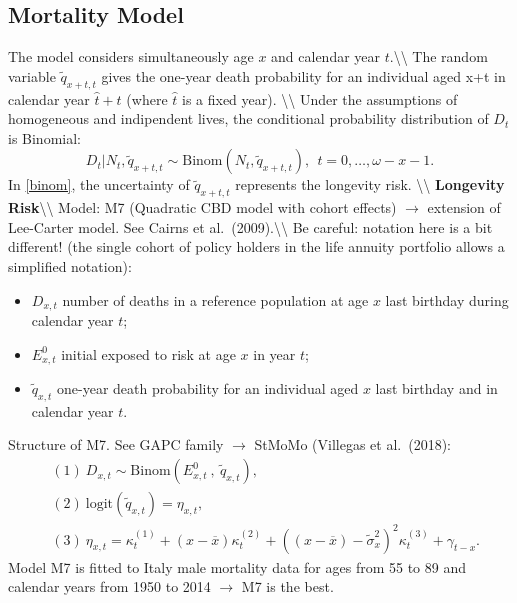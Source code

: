 \documentclass[]{article}
\begin{document}
\subsection{Mortality Model}

The model considers simultaneously age \(x\) and calendar year
\(t\).\textbackslash{}\textbackslash{} The random variable
\(\tilde{q}_{x+t,t}\) gives the one-year death probability for an
individual aged x+t in calendar year \(\hat{t}+t\) (where \(\hat{t}\) is
a fixed year). \textbackslash{}\textbackslash{} Under the assumptions of
homogeneous and indipendent lives, the conditional probability
distribution of \(D_t\) is Binomial: \begin{equation}
D_t|N_{t},\tilde{q}_{x+t,t} \sim \text{Binom}(N_{t},\tilde{q}_{x+t,t}), \ \ t=0,\ldots,\omega-x-1. \label{binom}
\end{equation} In \eqref{binom}, the uncertainty of
\(\tilde{q}_{x+t,t}\) represents the longevity risk.
\textbackslash{}\textbackslash{}
\textbf{Longevity Risk}\textbackslash{}\textbackslash{} Model: M7
(Quadratic CBD model with cohort effects) \(\rightarrow\) extension of
Lee-Carter model. See Cairns et
al.~(2009).\textbackslash{}\textbackslash{} Be careful: notation here is
a bit different! (the single cohort of policy holders in the life
annuity portfolio allows a simplified notation):

\begin{itemize}
    \item $D_{x,t}$ number of deaths in a reference population at age $x$ last birthday during calendar year $t$;
    \item $E_{x,t}^0$ initial exposed to risk  at age $x$ in year $t$;
    \item $\tilde{q}_{x,t}$ one-year death probability for an individual aged $x$ last birthday and in calendar year $t$.
    \end{itemize}

Structure of M7. See GAPC family \(\rightarrow\) StMoMo (Villegas et
al.~(2018): \begin{displaymath}
\begin{split}
& (1) \ D_{x,t} \sim \text{Binom}(E_{x,t}^0 \ , \ \tilde{q}_{x,t}), \\
& (2) \ \text{logit} (\tilde{q}_{x,t}) = \eta_{x,t}, \\
& (3) \ \eta_{x,t} = \kappa_t^{(1)} + (x-\overline{x}) \kappa_t^{(2)} + ((x-\overline{x}) - \tilde{\sigma}_x^2)^2  \kappa_t^{(3)} + \gamma_{t-x}.
\end{split}
\end{displaymath} Model M7 is fitted to Italy male mortality data for
ages from 55 to 89 and calendar years from 1950 to 2014 \(\rightarrow\)
M7 is the best.
\end{document}
